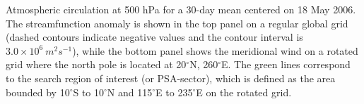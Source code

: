 \label{fig:rotation}
Atmospheric circulation at 500 hPa for a 30-day mean centered on 18 May 2006. The streamfunction anomaly is shown in the top panel on a regular global grid (dashed contours indicate negative values and the contour interval is $3.0 \times 10^6 \: m^2 s^{-1}$), while the bottom panel shows the meridional wind on a rotated grid where the north pole is located at 20$^{\circ}$N, 260$^{\circ}$E. The green lines correspond to the search region of interest (or PSA-sector), which is defined as the area bounded by 10$^{\circ}$S to 10$^{\circ}$N and 115$^{\circ}$E to 235$^{\circ}$E on the rotated grid.
